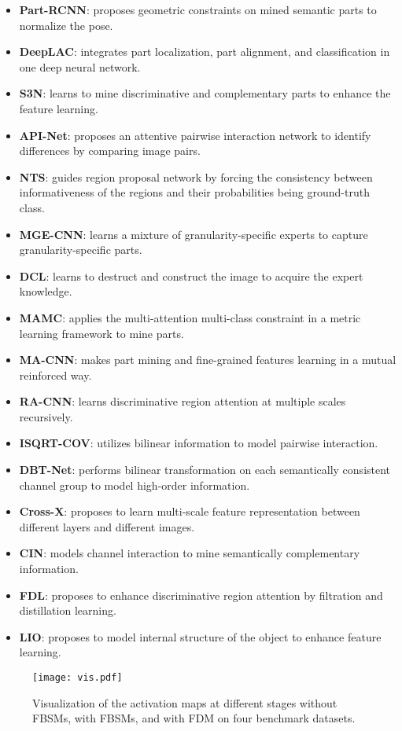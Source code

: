 \documentclass[conference]{IEEEtran}
\begin{document}
	\begin{itemize}
		\item \textbf{Part-RCNN}\cite{Part-RCNN}: proposes geometric constraints on mined semantic parts to normalize the pose.
		\item \textbf{DeepLAC}\cite{Deep-LAC}: integrates part localization, part alignment, and classification in one deep neural network.
		\item \textbf{S3N}\cite{S3N}: learns to mine discriminative and complementary parts to enhance the feature learning.
		\item \textbf{API-Net}\cite{API-NET}: proposes an attentive pairwise interaction network to identify differences by comparing image pairs.
		\item \textbf{NTS}\cite{NTS}: guides region proposal network by forcing the consistency between informativeness
		of the regions and their probabilities being ground-truth class.
		\item \textbf{MGE-CNN}\cite{MGE}: learns a mixture of granularity-specific experts to capture granularity-specific parts.
		\item \textbf{DCL}\cite{DCL}: learns to destruct and construct the image to acquire the expert knowledge.
		\item \textbf{MAMC}\cite{MAMC}: applies the multi-attention multi-class constraint in a
		metric learning framework to mine parts.
		\item \textbf{MA-CNN}\cite{MA-CNN}: makes part mining and fine-grained features learning in a mutual reinforced way.
		\item \textbf{RA-CNN}\cite{RA-CNN}: learns discriminative region attention at multiple scales recursively.
		\item \textbf{ISQRT-COV}\cite{BCNN}: utilizes bilinear information to model pairwise interaction.
		\item \textbf{DBT-Net}\cite{DBT-Net}: performs bilinear transformation on each semantically consistent channel group to model high-order information.
		\item \textbf{Cross-X}\cite{CrossX}: proposes to learn multi-scale feature representation between different layers and different images.
		\item \textbf{CIN}\cite{CIN}: models channel interaction to mine semantically complementary information.
		\item \textbf{FDL}\cite{FDL}: proposes to enhance discriminative region attention by filtration and distillation learning.
		\item \textbf{LIO}\cite{LIO}: proposes to model internal structure of
		the object to enhance feature learning.
	\end{itemize}
	\begin{figure*} 
		\centering
		\texttt{[image: vis.pdf]}
		\caption{Visualization of the activation maps at different stages without FBSMs, with FBSMs, and with FDM on four benchmark datasets.}
		\label{fig:vis}
	\end{figure*}
\end{document}
